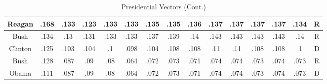 \begin{sidewaystable}
\begin{singlespace}
\begin{center}
\begin{tabular}{||c c c c c c c c c c c c c c c||}
\hline
Reagan & .168 & .133 & .123 & .133 & .133 & .135 & .135 & .136 & .137 & .137 & .137 & .137 & .134 & R \\ 
\hline
Bush & .134 & .13 & .131 & .133 & .133 & .137 & .139 & .14 & .143 & .143 & .143 & .143 & .14 & R \\ 
\hline
Clinton & .125 & .103 & .104 & .1 & .098 & .104 & .108 & .108 & .11 & .11 & .108 & .108 & .1 & D \\ 
\hline
Bush & .128 & .087 & .09 & .08 & .064 & .072 & .073 & .071 & .074 & .074 & .073 & .074 & .073 & R \\ 
\hline
Obama & .111 & .087 & .09 & .08 & .064 & .072 & .073 & .071 & .074 & .074 & .073 & .074 & .073 & D \\ 
\hline
 \hline
 \end{tabular}
\end{center}
\caption{Presidential Vectors (Cont.)}
\label{appendix:vector2}
\end{singlespace}
\end{sidewaystable}

